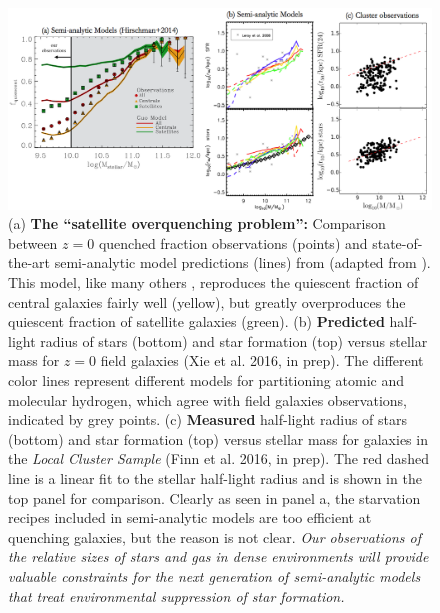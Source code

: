 \documentclass[11pt, preprint]{aastex}
\begin{document}
\begin{figure}[h!]
\begin{center}
\includegraphics[width=\textwidth]{model-comparisonv2.png}
\end{center}
\vspace{-0.5cm}
\caption{\small (a) {\bf The ``satellite overquenching problem'': }  
Comparison between $z=0$ quenched fraction observations (points)
    and state-of-the-art semi-analytic model predictions (lines) from
    \citealp {guo11a} (adapted from \citealt{Hirschmann14}). This
    model, like many others \citep[e.g.][]{somerville08,kimm09},
    reproduces the quiescent fraction of central galaxies fairly well
    (yellow), but greatly overproduces the quiescent fraction of
    satellite galaxies (green).  (b)  {\bf Predicted} half-light radius
  of stars (bottom) and star formation (top) versus stellar mass for
  $z = 0 $ field galaxies (Xie et al. 2016, in prep).
  The different color lines represent different models for partitioning
  atomic and molecular hydrogen, which agree with field galaxies observations, indicated by grey points. (c) {\bf Measured} half-light radius of stars (bottom) and star
formation (top) versus stellar mass for galaxies in the {\it Local
  Cluster Sample} (Finn et al. 2016, in prep).  The
red dashed line is a linear fit to the stellar half-light radius and
is shown in the top panel for comparison.  Clearly as seen in panel a, the starvation recipes included in semi-analytic models are too efficient at quenching galaxies, but the reason is not clear.  {\it Our observations of the relative sizes of stars and gas in dense environments will provide valuable constraints for the next generation of semi-analytic models that treat environmental suppression of star formation.}}
%
\label{lizhi_comparison}
\end{figure}
\end{document}
